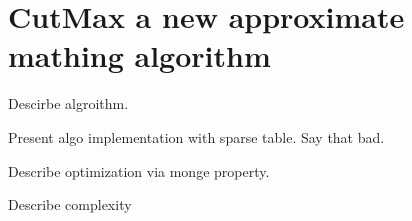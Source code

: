 \section*{CutMax a new approximate mathing algorithm}
\label{section:our}

Descirbe algroithm.

Present algo implementation with sparse table. Say that bad.

Describe optimization via monge property.

Describe complexity